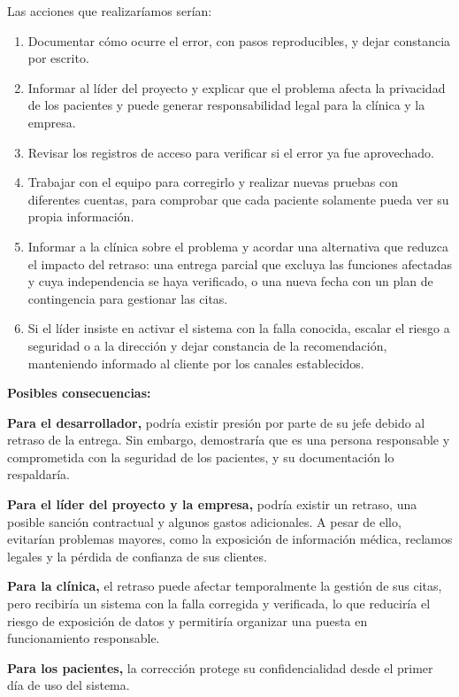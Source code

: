 \documentclass[12pt,a4paper,oneside]{article}
\newcommand{\rotulo}[1]{\par\Needspace{5\baselineskip}\noindent\textbf{#1}\par\nobreak}
\begin{document}
Las acciones que realizaríamos serían:

\begin{enumerate}[leftmargin=1.8em,itemsep=3pt]
    \item Documentar cómo ocurre el error, con pasos reproducibles, y dejar constancia por escrito.
    \item Informar al líder del proyecto y explicar que el problema afecta la privacidad de los pacientes y puede generar responsabilidad legal para la clínica y la empresa.
    \item Revisar los registros de acceso para verificar si el error ya fue aprovechado.
    \item Trabajar con el equipo para corregirlo y realizar nuevas pruebas con diferentes cuentas, para comprobar que cada paciente solamente pueda ver su propia información.
    \item Informar a la clínica sobre el problema y acordar una alternativa que reduzca el impacto del retraso: una entrega parcial que excluya las funciones afectadas y cuya independencia se haya verificado, o una nueva fecha con un plan de contingencia para gestionar las citas.
    \item Si el líder insiste en activar el sistema con la falla conocida, escalar el riesgo a seguridad o a la dirección y dejar constancia de la recomendación, manteniendo informado al cliente por los canales establecidos.
\end{enumerate}

\rotulo{Posibles consecuencias:}

\textbf{Para el desarrollador,} podría existir presión por parte de su jefe debido al retraso de la entrega. Sin embargo, demostraría que es una persona responsable y comprometida con la seguridad de los pacientes, y su documentación lo respaldaría.

\textbf{Para el líder del proyecto y la empresa,} podría existir un retraso, una posible sanción contractual y algunos gastos adicionales. A pesar de ello, evitarían problemas mayores, como la exposición de información médica, reclamos legales y la pérdida de confianza de sus clientes.

\textbf{Para la clínica,} el retraso puede afectar temporalmente la gestión de sus citas, pero recibiría un sistema con la falla corregida y verificada, lo que reduciría el riesgo de exposición de datos y permitiría organizar una puesta en funcionamiento responsable.

\textbf{Para los pacientes,} la corrección protege su confidencialidad desde el primer día de uso del sistema.
\end{document}
